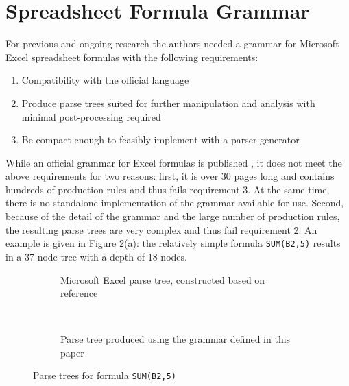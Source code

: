 \documentclass[times]{smrauth}
\begin{document}
\section{Spreadsheet Formula Grammar}
\label{section:grammar}

For previous and ongoing research the authors needed a grammar for Microsoft Excel spreadsheet formulas with the following requirements:

\label{sec:designgoals}
\begin{enumerate}
	\item Compatibility with the official language
	\item Produce parse trees suited for further manipulation and analysis with minimal post-processing required
	\item Be compact enough to feasibly implement with a parser generator
\end{enumerate}

While an official grammar for Excel formulas is published \cite{ExcelOfficialGrammar}, it does not meet the above requirements for two reasons: first, it is over 30 pages long and contains hundreds of production rules and thus fails requirement 3. At the same time, there is no standalone implementation of the grammar available for use.
Second, because of the detail of the grammar and the large number of production rules, the resulting parse trees are very complex and thus fail requirement 2.
An example is given in Figure \ref{figure:parsetrees}(a): the relatively simple formula \texttt{SUM(B2,5)} results in a 37-node tree with a depth of 18 nodes.

\begin{figure}
	\centering
	\begin{subfigure}[b]{0.45\textwidth}
		\centering
		\hspace{-2em}
		\scalebox{.7}{
			
		}
		\caption{Microsoft Excel parse tree, constructed based on reference \cite{ExcelOfficialGrammar}}
	\end{subfigure}
	~
	\begin{subfigure}[b]{0.45\textwidth}
		\centering
		\vspace{1em}
		\hspace{-0.5em}
		\scalebox{.7}{
			
		}
		\caption{Parse tree produced using the grammar defined in this paper}
		\label{figure:ourparsetree}
	\end{subfigure}
	\caption{Parse trees for formula \texttt{SUM(B2,5)}}
	\label{figure:parsetrees}
\end{figure}
\end{document}
